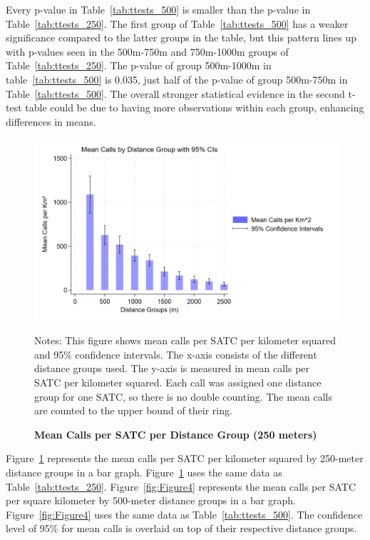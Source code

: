 \documentclass[12pt]{article}
\begin{document}
Every p-value in Table~\ref{tab:ttests_500} is smaller than the p-value in Table~\ref{tab:ttests_250}. The first group of Table~\ref{tab:ttests_500} has a weaker significance compared to the latter groups in the table, but this pattern lines up with p-values seen in the 500m-750m and 750m-1000m groups of Table~\ref{tab:ttests_250}. The p-value of group 500m-1000m in table~\ref{tab:ttests_500} is 0.035, just half of the p-value of group 500m-750m in Table~\ref{tab:ttests_500}. The overall stronger statistical evidence in the second t-test table could be due to having more observations within each group, enhancing differences in means.

\begin{figure}[H]
    \centering
\includegraphics[width=0.75\linewidth]{Reproducibility Package/Downloaded_calls/Visual_Graphics_Downloaded_calls/250_CI_Graph.png}
    \caption{\textbf{Mean Calls per SATC per Distance Group (250 meters)}}
     \label{fig:Figure3}
    \centering\footnotesize{Notes: This figure shows mean calls per SATC per kilometer squared and 95\% confidence intervals. The x-axis consists of the different distance groups used. The y-axis is measured in mean calls per SATC per kilometer squared. Each call was assigned one distance group for one SATC, so there is no double counting. The mean calls are counted to the upper bound of their ring.}
\end{figure}

Figure~\ref{fig:Figure3} represents the mean calls per SATC per kilometer squared by 250-meter distance groups in a bar graph. Figure~\ref{fig:Figure3} uses the same data as Table~\ref{tab:ttests_250}. Figure~\ref{fig:Figure4} represents the mean calls per SATC per square kilometer by 500-meter distance groups in a bar graph. Figure~\ref{fig:Figure4} uses the same data as Table~\ref{tab:ttests_500}. The confidence level of 95\% for mean calls is overlaid on top of their respective distance groups. 
\end{document}
